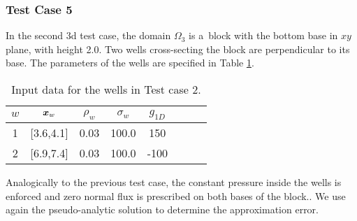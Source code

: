 \subsubsection{Test Case 5}
In the second 3d test case, the domain $\Omega_3$ is a~block with the bottom base in $xy$ plane,
with height 2.0.
Two wells cross-secting the block are perpendicular to its base.
The parameters of the wells are specified in Table \ref{tab:tc5_data}.
%
\begin{table}[!hb]
\begin{center}
\begin{tabular}{cccccccc}
\toprule
$w$ & $\mathbf{\boldsymbol{x}}_w$  & $\rho_w$ & $\sigma_w$ & $g_{1D}$\\
\midrule
1& [3.6,4.1] & 0.03 & 100.0 & 150 \\
2& [6.9,7.4] & 0.03 & 100.0 & -100 \\
\bottomrule
\end{tabular}
\caption{Input data for the wells in Test case 2.}
\label{tab:tc5_data}
\end{center}
\end{table}

Analogically to the previous test case, the constant pressure inside the wells is enforced
and zero normal flux is prescribed on both bases of the block..
We use again the pseudo-analytic solution to determine the approximation error.

